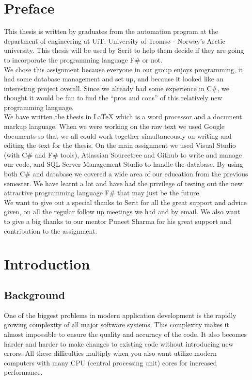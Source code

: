 \documentclass[12pt, a4paper]{article}
\begin{document}
\newpage
\section*{Preface}
This thesis is written by graduates from the automation program at the department of engineering  at UiT: University of Tromsø - Norway's Arctic university. This thesis will be used by Serit to help them decide if they are going to incorporate the programming language F\# or not.\\

We chose this assignment because everyone in our group enjoys programming, it had some database management and set up, and because it looked like an interesting project overall. Since we already had some experience in C\#, we thought it would be fun to find the “pros and cons” of this relatively new programming language.\\

We have written the thesis in LaTeX which is a word processor and a document markup language. When we were working on the raw text we used Google documents so that we all could work together simultaneously on writing and editing the text for the thesis. On the main assignment we used Visual Studio (with C\# and F\# tools), Atlassian Sourcetree and Github to write and manage our code, and SQL Server Management Studio to handle the database. By using both C\# and database we covered a wide area of our education from the previous semester. We have learnt a lot and have had the privilege of testing out the new attractive programming language F\# that may just be the future.\\ 

We want to give out a special thanks to Serit for all the great support and advice given, on all the regular follow up meetings we had and by email. We also want to give a big thanks to our mentor Puneet Sharma for his great support and contribution to the assignment.

\newpage
\tableofcontents

\newpage
\section{Introduction}
\subsection{Background}
One of the biggest problems in modern application development is the rapidly growing complexity of all major software systems. This complexity makes it almost impossible to ensure the quality and accuracy of the code. It also becomes harder and harder to make changes to existing code without introducing new errors. All these difficulties multiply when you also want utilize modern computers with many CPU (central processing unit) cores for increased performance.\\
\end{document}
